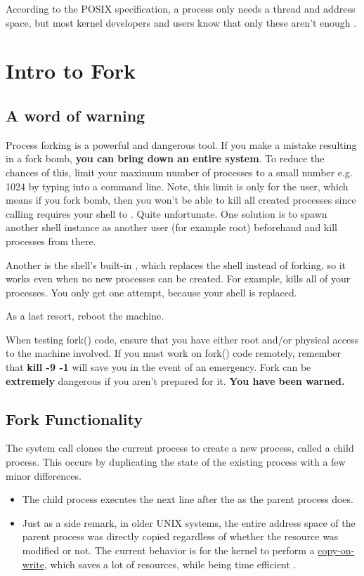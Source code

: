 According to the POSIX specification, a process only needs a thread and address space, but most kernel developers and users know that only these aren't enough \cite{process_def}.

\section{Intro to Fork}

\subsection{A word of warning}

Process forking is a powerful and dangerous tool.
If you make a mistake resulting in a fork bomb, \textbf{you can bring down an entire system}.
To reduce the chances of this, limit your maximum number of processes to a small number e.g. 1024 by typing  into a command line.
Note, this limit is only for the user, which means if you fork bomb, then you won't be able to kill all created processes since calling  requires your shell to .
Quite unfortunate.
One solution is to spawn another shell instance as another user (for example root) beforehand and kill processes from there.

Another is the shell's built-in , which replaces the shell instead of forking, so it works even when no new processes can be created.
For example,  kills all of your processes.
You only get one attempt, because your shell is replaced.

As a last resort, reboot the machine.

When testing fork() code, ensure that you have either root and/or physical access to the machine involved.
If you must work on fork() code remotely, remember that \textbf{kill -9 -1} will save you in the event of an emergency.
Fork can be \textbf{extremely} dangerous if you aren't prepared for it. \textbf{You have been warned.}

\subsection{Fork Functionality}

The  system call clones the current process to create a new process, called a child process.
This occurs by duplicating the state of the existing process with a few minor differences.
\begin{itemize}
    \item The child process executes the next line after the  as the parent process does.
    \item Just as a side remark, in older UNIX systems, the entire address space of the parent process was directly copied regardless of whether the resource was modified or not. The current behavior is for the kernel to perform a \href{https://en.wikipedia.org/wiki/Copy-on-write}{copy-on-write}, which saves a lot of resources, while being time efficient \cite[Copy-on-write section]{Bovet:2005:ULK:1077084}.
\end{itemize}

